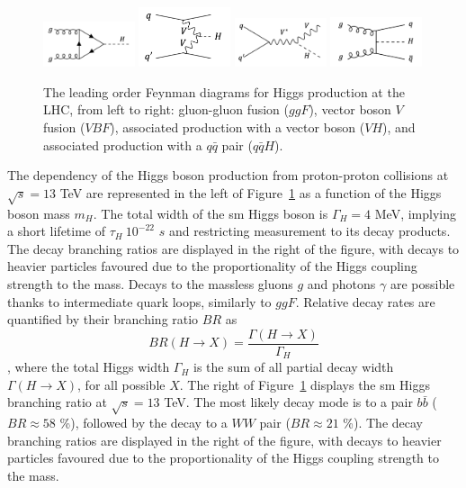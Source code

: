 \begin{figure}[h!]
    \center
    \includegraphics[width=0.24\textwidth]{Images/Theory/ggH.png}
    \includegraphics[width=0.24\textwidth]{Images/Theory/vvH.png}
    \includegraphics[width=0.24\textwidth]{Images/Theory/vh.png}
    \includegraphics[width=0.24\textwidth]{Images/Theory/qqH.png}
    \caption{The leading order Feynman diagrams for Higgs production at the LHC, from left to right: gluon-gluon fusion ($ggF$), vector boson $V$ fusion ($VBF$), associated production with a vector boson ($VH$), and associated production with a $q\bar{q}$ pair ($q\bar{q}H$).}
    \label{fig:prodH}
\end{figure}

The dependency of the Higgs boson production from proton-proton collisions at $\sqrt{s} = 13$ TeV are represented in the left of Figure~\ref{fig:prodH} as a function of the Higgs boson mass $m_H$. The total width of the \gls{sm} Higgs boson is $\Gamma_H = 4$ MeV, implying a short lifetime of $\tau_H ~ 10^{-22}$ $s$ and restricting measurement to its decay products. The decay branching ratios are displayed in the right of the figure, with decays to heavier particles favoured due to the proportionality of the Higgs coupling strength to the mass. Decays to the massless gluons $g$ and photons $\gamma$ are possible thanks to intermediate quark loops, similarly to $ggF$. Relative decay rates are quantified by their branching ratio $BR$ as
\begin{equation}
    BR(H \rightarrow X) = \frac{\Gamma(H\rightarrow X)}{\Gamma_H}
\end{equation},
where the total Higgs width $\Gamma_H$ is the sum of all partial decay width $\Gamma(H\rightarrow X)$, for all possible $X$. The right of Figure~\ref{fig:prodH} displays the \gls{sm} Higgs branching ratio at $\sqrt{s} = 13$ TeV. The most likely decay mode is to a pair $b\bar{b}$ ($BR \approx 58$ \%), followed by the decay to a $WW$ pair ($BR \approx 21$ \%). The decay branching ratios are displayed in the right of the figure, with decays to heavier particles favoured due to the proportionality of the Higgs coupling strength to the mass.

